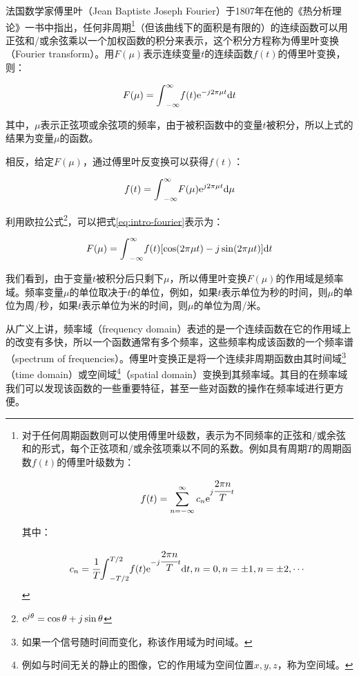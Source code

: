 法国数学家傅里叶（Jean Baptiste Joseph Fourier）于1807年在他的《热分析理论》一书中指出，任何非周期\footnote{对于任何周期函数则可以使用傅里叶级数，表示为不同频率的正弦和/或余弦和的形式，每个正弦项和/或余弦项乘以不同的系数。例如具有周期$T$的周期函数$f(t)$的傅里叶级数为：

\begin{equation}\label{eq:fourier-series}
	f(t)=\sum^{\infty}_{n=-\infty}c_n {\rm e}^{j \cfrac{2\pi n}{T}t}
\end{equation}

\noindent 其中：

\begin{equation}
	c_n= \cfrac{1}{T}{\rm \int}^{T/2}_{-T/2}f(t){\rm e}^{-j \cfrac{2\pi n}{T}t}{\rm d}t, n=0,n=\pm 1,n=\pm 2,\cdots
\end{equation}

}（但该曲线下的面积是有限的）的连续函数可以用正弦和/或余弦乘以一个加权函数的积分来表示，这个积分方程称为傅里叶变换（Fourier transform）。用$F(\mu)$表示连续变量$t$的连续函数$f(t)$的傅里叶变换，则：

\begin{equation}\label{eq:intro-fourier}
	F(\mu)={\rm \int}^{\infty}_{-\infty}f(t){\rm e}^{-j2\pi\mu t}{\rm d}t
\end{equation}

\noindent 其中，$\mu$表示正弦项或余弦项的频率，由于被积函数中的变量$t$被积分，所以上式的结果为变量$\mu$的函数。

相反，给定$F(\mu)$，通过傅里叶反变换可以获得$f(t)$：

\begin{equation}
	f(t)={\rm \int}^{\infty}_{-\infty}F(\mu){\rm e}^{j2\pi\mu t}{\rm d}\mu
\end{equation}

\noindent 利用欧拉公式\footnote{${\rm e}^{j\theta}=\cos\theta +j\sin\theta$}，可以把式\ref{eq:intro-fourier}表示为：

\begin{equation}
	F(\mu)={\rm \int}^{\infty}_{-\infty}f(t)[\cos (2\pi\mu t)-j\sin(2\pi\mu t)]{\rm d}t
\end{equation}

我们看到，由于变量$t$被积分后只剩下$\mu$，所以傅里叶变换$F(\mu)$的作用域是频率域。频率变量$\mu$的单位取决于$t$的单位，例如，如果$t$表示单位为秒的时间，则$\mu$的单位为周/秒，如果$t$表示单位为米的时间，则$\mu$的单位为周/米。

从广义上讲，频率域（frequency domain）表述的是一个连续函数在它的作用域上的改变有多快，所以一个函数通常有多个频率，这些频率构成该函数的一个频率谱（spectrum of frequencies）。傅里叶变换正是将一个连续非周期函数由其时间域\footnote{如果一个信号随时间而变化，称该作用域为时间域。}（time domain）或空间域\footnote{例如与时间无关的静止的图像，它的作用域为空间位置$x,y,z$，称为空间域。}（spatial domain）变换到其频率域。其目的在频率域我们可以发现该函数的一些重要特征，甚至一些对函数的操作在频率域进行更方便。

